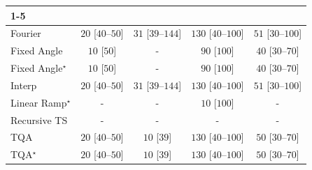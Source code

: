 \begin{tabular}{l|cccc|}
\cline{1-5}
\multicolumn{5}{c}{\rule{0pt}{8pt}PP} \\
\midrule
Fourier & {\cellcolor[HTML]{F5FBF3}} \color[HTML]{000000} $20$ [$40$--$50$] & {\cellcolor[HTML]{F4FBF1}} \color[HTML]{000000} $31$ [$39$--$144$] & {\cellcolor[HTML]{DFF3DA}} \color[HTML]{000000} $130$ [$40$--$100$] & {\cellcolor[HTML]{F0F9EC}} \color[HTML]{000000} $51$ [$30$--$100$] \\
Fixed Angle & {\cellcolor[HTML]{F7FCF5}} \color[HTML]{000000} $10$ [$50$] & {\cellcolor[HTML]{000000}} \color[HTML]{F1F1F1} {\cellcolor{white}} \color{black} - & {\cellcolor[HTML]{E9F7E5}} \color[HTML]{000000} $90$ [$100$] & {\cellcolor[HTML]{F2FAEF}} \color[HTML]{000000} $40$ [$30$--$70$] \\
Fixed Angle$^\star$ & {\cellcolor[HTML]{F7FCF5}} \color[HTML]{000000} $10$ [$50$] & {\cellcolor[HTML]{000000}} \color[HTML]{F1F1F1} {\cellcolor{white}} \color{black} - & {\cellcolor[HTML]{E9F7E5}} \color[HTML]{000000} $90$ [$100$] & {\cellcolor[HTML]{F2FAEF}} \color[HTML]{000000} $40$ [$30$--$70$] \\
Interp & {\cellcolor[HTML]{F5FBF3}} \color[HTML]{000000} $20$ [$40$--$50$] & {\cellcolor[HTML]{F4FBF1}} \color[HTML]{000000} $31$ [$39$--$144$] & {\cellcolor[HTML]{DFF3DA}} \color[HTML]{000000} $130$ [$40$--$100$] & {\cellcolor[HTML]{F0F9EC}} \color[HTML]{000000} $51$ [$30$--$100$] \\
Linear Ramp$^\star$ & {\cellcolor[HTML]{000000}} \color[HTML]{F1F1F1} {\cellcolor{white}} \color{black} - & {\cellcolor[HTML]{000000}} \color[HTML]{F1F1F1} {\cellcolor{white}} \color{black} - & {\cellcolor[HTML]{F7FCF5}} \color[HTML]{000000} $10$ [$100$] & {\cellcolor[HTML]{000000}} \color[HTML]{F1F1F1} {\cellcolor{white}} \color{black} - \\
Recursive TS & {\cellcolor[HTML]{000000}} \color[HTML]{F1F1F1} {\cellcolor{white}} \color{black} - & {\cellcolor[HTML]{000000}} \color[HTML]{F1F1F1} {\cellcolor{white}} \color{black} - & {\cellcolor[HTML]{000000}} \color[HTML]{F1F1F1} {\cellcolor{white}} \color{black} - & {\cellcolor[HTML]{000000}} \color[HTML]{F1F1F1} {\cellcolor{white}} \color{black} - \\
TQA & {\cellcolor[HTML]{F5FBF3}} \color[HTML]{000000} $20$ [$40$--$50$] & {\cellcolor[HTML]{F7FCF5}} \color[HTML]{000000} $10$ [$39$] & {\cellcolor[HTML]{DFF3DA}} \color[HTML]{000000} $130$ [$40$--$100$] & {\cellcolor[HTML]{F0F9ED}} \color[HTML]{000000} $50$ [$30$--$70$] \\
TQA$^\star$ & {\cellcolor[HTML]{F5FBF3}} \color[HTML]{000000} $20$ [$40$--$50$] & {\cellcolor[HTML]{F7FCF5}} \color[HTML]{000000} $10$ [$39$] & {\cellcolor[HTML]{DFF3DA}} \color[HTML]{000000} $130$ [$40$--$100$] & {\cellcolor[HTML]{F0F9ED}} \color[HTML]{000000} $50$ [$30$--$70$] \\

\end{tabular}
